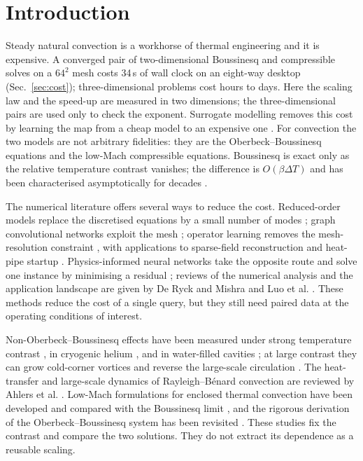 \documentclass[preprint,11pt,a4paper,times]{elsarticle}
\begin{document}
\section{Introduction}
\label{sec:intro}

Steady natural convection is a workhorse of thermal engineering and it is expensive. A
converged pair of two-dimensional Boussinesq and compressible solves on a $64^2$ mesh costs
34\,s of wall clock on an eight-way desktop (Sec.~\ref{sec:cost}); three-dimensional problems
cost hours to days. Here the scaling law and the speed-up are measured in two dimensions; the
three-dimensional pairs are used only to check the exponent. Surrogate modelling removes this cost by learning the map from a cheap
model to an expensive one \citep{giacomini2026surrogates,meng2025physics}. For convection the
two models are not arbitrary fidelities: they are the Oberbeck--Boussinesq equations and the
low-Mach compressible equations. Boussinesq is exact only as the relative temperature contrast
vanishes; the difference is $O(\beta\Delta T)$ and has been characterised asymptotically for
decades \citep{spiegel1960boussinesq,gray1976validity}.

The numerical literature offers several ways to reduce the cost. Reduced-order models replace
the discretised equations by a small number of modes \citep{huhn2022parametric}; graph
convolutional networks exploit the mesh \citep{feng2024graph,peng2023physics}; operator
learning removes the mesh-resolution constraint
\citep{lu2021learning,wang2021learning,li2021fourier}, with applications to sparse-field
reconstruction \citep{zhao2023recfno} and heat-pipe startup \citep{yu2026fourier}.
Physics-informed neural networks take the opposite route and solve one instance by minimising a
residual \citep{raissi2019physics,cai2021physics,jalili2023physics,sahin2023deep}; reviews of
the numerical analysis and the application landscape are given by De Ryck and Mishra
\citep{deryck2024numerical} and Luo et al. \citep{luo2025physics}. These methods reduce the cost of a single query, but they still need
paired data at the operating conditions of interest.

Non-Oberbeck--Boussinesq effects have been measured under strong temperature contrast
\citep{yik2020turbulent}, in cryogenic helium \citep{macek2023assessing}, and in water-filled
cavities \citep{pan2023non}; at large contrast they can grow cold-corner vortices and reverse
the large-scale circulation \citep{xia2016flow}. The heat-transfer and large-scale dynamics of
Rayleigh--B\'enard convection are reviewed by Ahlers et al. \citep{ahlers2009heat}. Low-Mach formulations for enclosed thermal
convection have been developed and compared with the Boussinesq limit
\citep{zhang2023investigation,satake2024mathematical}, and the rigorous derivation of the
Oberbeck--Boussinesq system has been revisited \citep{bella2023rigorous}. These studies fix the
contrast and compare the two solutions. They do not extract its dependence as a reusable scaling.
\end{document}

